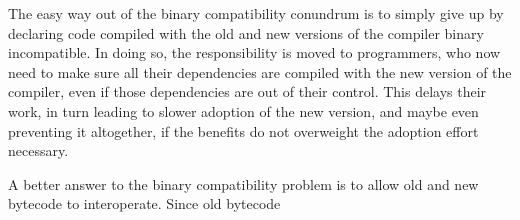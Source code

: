The easy way out of the binary compatibility conundrum is to simply give up by declaring code compiled with the old and new versions of the compiler binary incompatible. In doing so, the responsibility is moved to programmers, who now need to make sure all their dependencies are compiled with the new version of the compiler, even if those dependencies are out of their control. This delays their work, in turn leading to slower adoption of the new version, and maybe even preventing it altogether, if the benefits do not overweight the adoption effort necessary.

A better answer to the binary compatibility problem is to allow old and new bytecode to interoperate. Since old bytecode






